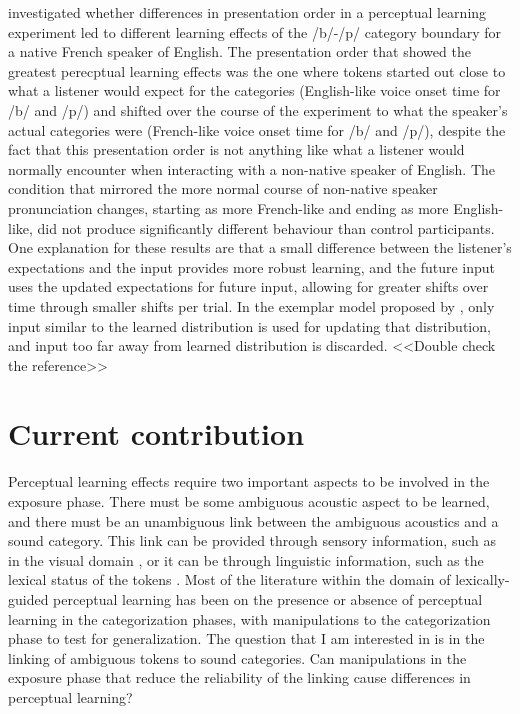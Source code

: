 %
\citet{Sumner2011} investigated whether differences in presentation order in a perceptual learning experiment led to different learning effects of the /b/-/p/ category boundary for a native French speaker of English.  
The presentation order that showed the greatest perecptual learning effects was the one where tokens started out close to what a listener would expect for the categories (English-like voice onset time for /b/ and /p/) and shifted over the course of the experiment to what the speaker's actual categories were (French-like voice onset time for /b/ and /p/), despite the fact that this presentation order is not anything like what a listener would normally encounter when interacting with a non-native speaker of English.  
The condition that mirrored the more normal course of non-native speaker pronunciation changes, starting as more French-like and ending as more English-like, did not produce significantly different behaviour than control participants.  
One explanation for these results are that a small difference between the listener's expectations and the input provides more robust learning, and the future input uses the updated expectations for future input, allowing for greater shifts over time through smaller shifts per trial.  
In the exemplar model proposed by \citet{Pierrehumbert2002}, only input similar to the learned distribution is used for updating that distribution, and input too far away from learned distribution is discarded. <<Double check the reference>>

\section{Current contribution}

Perceptual learning effects require two important aspects to be involved in the exposure phase.  
There must be some ambiguous acoustic aspect to be learned, and there must be an unambiguous link between the ambiguous acoustics and a sound category. 
This link can be provided through sensory information, such as in the visual domain \citep{Bertelson2003}, or it can be through linguistic information, such as the lexical status of the tokens \citep{Norris2003}. 
Most of the literature within the domain of lexically-guided perceptual learning has been on the presence or absence of perceptual learning in the categorization phases, with manipulations to the categorization phase to test for generalization.  
The question that I am interested in is in the linking of ambiguous tokens to sound categories.  
Can manipulations in the exposure phase that reduce the reliability of the linking cause differences in perceptual learning?

